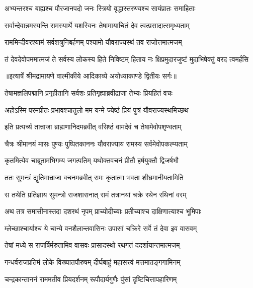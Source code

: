 \twolineshloka
{अभ्यन्तरश्च बाह्यश्च पौरजानपदो जनः}
{स्त्रियो वृद्धास्तरुण्यश्च सायंप्रातः समाहिताः} %

\twolineshloka
{सर्वान्देवान्नमस्यन्ति रामस्यार्थे यशस्विनः}
{तेषामायाचितं देव त्वत्प्रसादात्समृध्यताम्} %

\twolineshloka
{राममिन्दीवरश्यामं सर्वशत्रुनिबर्हणम्}
{पश्यामो यौवराज्यस्थं तव राजोत्तमात्मजम्} %

\fourlineindentedshloka
{तं देवदेवोपममात्मजं ते}
{ सर्वस्य लोकस्य हिते निविष्टम्}
{हिताय नः क्षिप्रमुदारजुष्टं}
{ मुदाभिषेक्तुं वरद त्वमर्हसि} %


{॥इत्यार्षे श्रीमद्रामायणे वाल्मीकीये आदिकाव्ये अयोध्याकाण्डे द्वितीयः सर्गः॥}


\twolineshloka
{तेषामज्ञलिपद्मानि प्रगृहीतानि सर्वशः}
{प्रतिगृह्याब्रवीद्राजा तेभ्यः प्रियहितं वचः} %

\twolineshloka
{अहोऽस्मि परमप्रीतः प्रभावश्चातुलो मम}
{यन्मे ज्येष्ठं प्रियं पुत्रं यौवराज्यस्थमिच्छथ} %

\twolineshloka
{इति प्रत्यर्च्य तान्राजा ब्राह्मणानिदमब्रवीत्}
{वसिष्ठं वामदेवं च तेषामेवोपशृण्वताम्} %

\twolineshloka
{चैत्रः श्रीमानयं मासः पुण्यः पुष्पितकाननः}
{यौवराज्याय रामस्य सर्वमेवोपकल्प्यताम्} %

\twolineshloka
{कृतमित्येव चाब्रूतामभिगम्य जगत्पतिम्}
{यथोक्तवचनं प्रीतौ हर्षयुक्तौ द्विजर्षभौ} %

\twolineshloka
{ततः सुमन्त्रं द्युतिमान्राजा वचनमब्रवीत्}
{रामः कृतात्मा भवता शीघ्रमानीयतामिति} %

\twolineshloka
{स तथेति प्रतिज्ञाय सुमन्त्रो राजशासनात्}
{रामं तत्रानयां चक्रे रथेन रथिनां वरम्} %

\twolineshloka
{अथ तत्र समासीनास्तदा दशरथं नृपम्}
{प्राच्योदीच्याः प्रतीच्याश्च दाक्षिणात्याश्च भूमिपाः} %

\twolineshloka
{म्लेच्छाश्चार्याश्च ये चान्ये वनशैलान्तवासिनः}
{उपासां चक्रिरे सर्वे तं देवा इव वासवम्} %

\twolineshloka
{तेषां मध्ये स राजर्षिर्मरुतामिव वासवः}
{प्रासादस्थो रथगतं ददर्शायान्तमात्मजम्} %

\twolineshloka
{गन्धर्वराजप्रतिमं लोके विख्यातपौरुषम्}
{दीर्घबाहुं महासत्त्वं मत्तमातङ्गगामिनम्} %

\twolineshloka
{चन्द्रकान्ताननं राममतीव प्रियदर्शनम्}
{रूपौदार्यगुणैः पुंसां दृष्टिचित्तापहारिणम्} %

